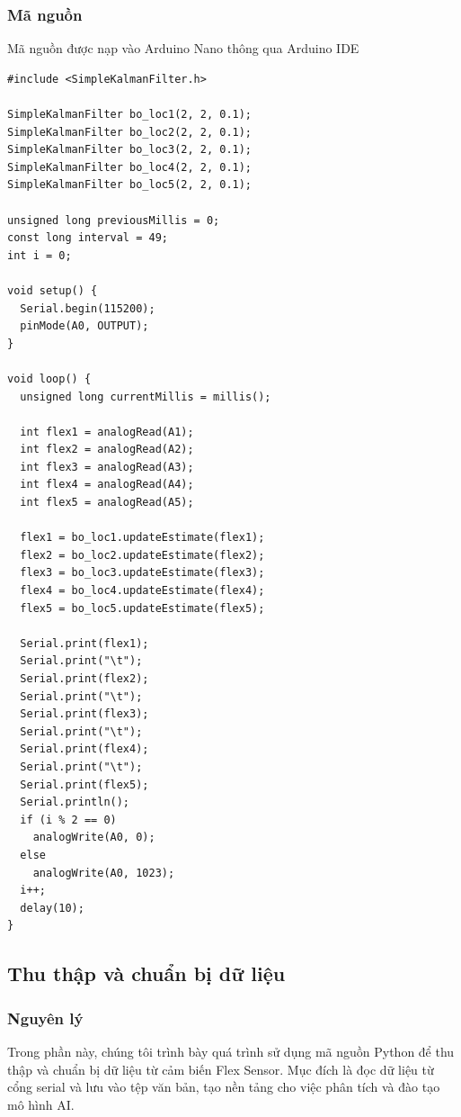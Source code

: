 \subsubsection{Mã nguồn}

\indent Mã nguồn được nạp vào Arduino Nano thông qua Arduino IDE

\begin{lstlisting}
#include <SimpleKalmanFilter.h>

SimpleKalmanFilter bo_loc1(2, 2, 0.1);
SimpleKalmanFilter bo_loc2(2, 2, 0.1);
SimpleKalmanFilter bo_loc3(2, 2, 0.1);
SimpleKalmanFilter bo_loc4(2, 2, 0.1);
SimpleKalmanFilter bo_loc5(2, 2, 0.1);

unsigned long previousMillis = 0;  
const long interval = 49;   
int i = 0;

void setup() {
  Serial.begin(115200);
  pinMode(A0, OUTPUT);
}

void loop() {
  unsigned long currentMillis = millis();
  
  int flex1 = analogRead(A1);
  int flex2 = analogRead(A2);
  int flex3 = analogRead(A3);
  int flex4 = analogRead(A4);
  int flex5 = analogRead(A5);

  flex1 = bo_loc1.updateEstimate(flex1);
  flex2 = bo_loc2.updateEstimate(flex2);
  flex3 = bo_loc3.updateEstimate(flex3);
  flex4 = bo_loc4.updateEstimate(flex4);
  flex5 = bo_loc5.updateEstimate(flex5);

  Serial.print(flex1);
  Serial.print("\t");
  Serial.print(flex2);
  Serial.print("\t");
  Serial.print(flex3);
  Serial.print("\t");
  Serial.print(flex4);
  Serial.print("\t");
  Serial.print(flex5);
  Serial.println();
  if (i % 2 == 0)
    analogWrite(A0, 0);
  else
    analogWrite(A0, 1023);
  i++;
  delay(10); 
}
\end{lstlisting}

\subsection{Thu thập và chuẩn bị dữ liệu}

\subsubsection{Nguyên lý}

\indent Trong phần này, chúng tôi trình bày quá trình sử dụng mã nguồn Python để thu thập và chuẩn bị dữ liệu từ cảm biến Flex Sensor. Mục đích là đọc dữ liệu từ cổng serial và lưu vào tệp văn bản, tạo nền tảng cho việc phân tích và đào tạo mô hình AI.

